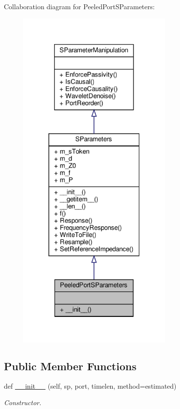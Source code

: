 Collaboration diagram for Peeled\+Port\+S\+Parameters\+:\nopagebreak
\begin{figure}[H]
\begin{center}
\leavevmode
\includegraphics[width=220pt]{classSignalIntegrity_1_1ImpedanceProfile_1_1PeeledPortSParameters_1_1PeeledPortSParameters__coll__graph}
\end{center}
\end{figure}
\subsection*{Public Member Functions}
\begin{DoxyCompactItemize}
\item 
def \hyperlink{classSignalIntegrity_1_1ImpedanceProfile_1_1PeeledPortSParameters_1_1PeeledPortSParameters_a2f07334b8ebb7d96d8bbfbe1f5425e3b}{\+\_\+\+\_\+init\+\_\+\+\_\+} (self, sp, port, timelen, method=\textquotesingle{}estimated\textquotesingle{})
\begin{DoxyCompactList}\small\item\em Constructor. \end{DoxyCompactList}\end{DoxyCompactItemize}


